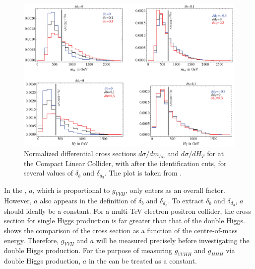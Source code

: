 \begin{figure}[htbp]
\centering
\includegraphics[width=1\textwidth]{theory/MhhHtDistribution}
\caption[]
{Normalized differential cross sections $d\sigma/dm_{hh}$ and $d\sigma/dH_{T}$ for  at the Compact Linear Collider, with  after the identification cuts, for several values of $\delta_{b}$ and $\delta_{d_3}$. The plot is taken from \cite{Contino:2013gna}.}
\label{fig:theoryMhhHtDistribution}
\end{figure}

In the , $a$, which is proportional to $g_{VVH}$, only enters as an overall factor. However, $a$ also appears in the definition of $\delta_{b}$ and $\delta_{d_3}$. To extract $\delta_{b}$ and $\delta_{d_3}$, $a$ should ideally be a constant. For a multi-TeV electron-positron collider, the cross section for single Higgs production is far greater than that of the double Higgs.  shows the comparison of the cross section as a function of the centre-of-mass energy. Therefore, $g_{VVH}$ and $a$ will be measured precisely before investigating the double Higgs production. For the purpose of measuring $g_{VVHH}$ and $g_{HHH}$ via double Higgs production, $a$ in the  can be treated as a constant.

